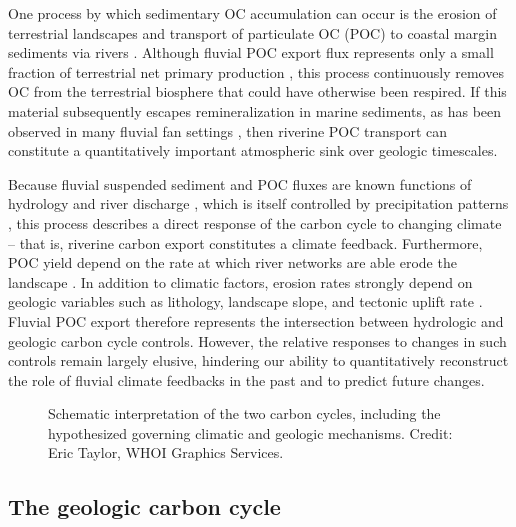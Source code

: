 One process by which sedimentary OC accumulation can occur is the erosion of terrestrial landscapes and transport of particulate OC (POC) to coastal margin sediments via rivers \citep{Ludwig:1996ul,Schlunz:2000tl}. Although fluvial POC export flux represents only a small fraction of terrestrial net primary production \citep[\textit{i.e.} $\leq 1$\%;][]{Galy:2015fx}, this process continuously removes OC from the terrestrial biosphere that could have otherwise been respired. If this material subsequently escapes remineralization in marine sediments, as has been observed in many fluvial fan settings \citep{Derry:1996um,Burdige:2005tr,Galy:2007ev,Hilton:2008fo}, then riverine POC transport can constitute a quantitatively important atmospheric  sink over geologic timescales. 

Because fluvial suspended sediment and POC fluxes are known functions of hydrology and river discharge \citep{Milliman:2011ug}, which is itself controlled by precipitation patterns \citep[\textit{e.g.}][]{Jian:2009bz}, this process describes a direct response of the carbon cycle to changing climate -- that is, riverine carbon export constitutes a climate feedback. Furthermore, POC yield depend on the rate at which river networks are able erode the landscape \citep{Ludwig:1996ul,Ludwig:1998ud,Galy:2015fx}. In addition to climatic factors, erosion rates strongly depend on geologic variables such as lithology, landscape slope, and tectonic uplift rate \citep{Dadson:2003kl,Milliman:2011ug,Hilton:2016dz}. Fluvial POC export therefore represents the intersection between hydrologic and geologic carbon cycle controls. However, the relative responses to changes in such controls remain largely elusive, hindering our ability to quantitatively reconstruct the role of fluvial climate feedbacks in the past and to predict future changes.

\begin{figure}[t]
	\caption[Schematic representation of Earth's two carbon cycles]{Schematic interpretation of the two carbon cycles, including the hypothesized governing climatic and geologic mechanisms. Credit: Eric Taylor, WHOI Graphics Services.}
	\label{Ch1Fig:2}
\end{figure}

\subsection{The geologic carbon cycle}


